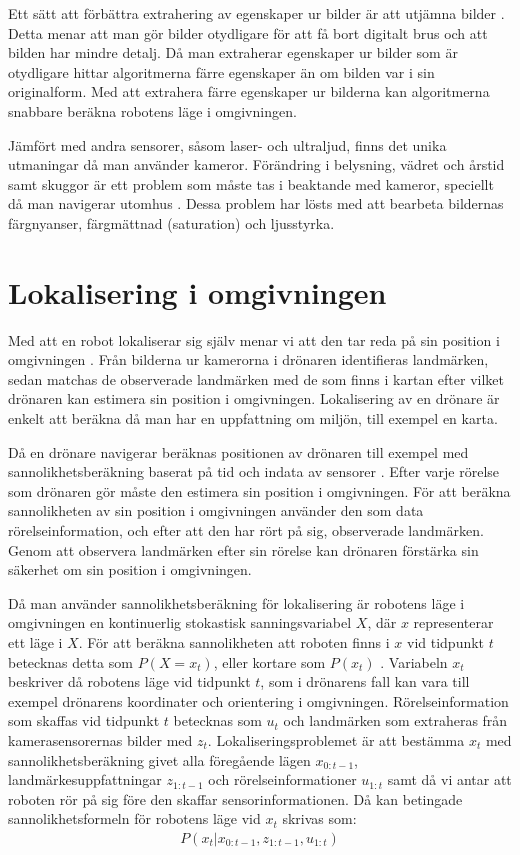 Ett sätt att förbättra extrahering av egenskaper ur bilder är att utjämna bilder \citep{mapbuildingsift}. Detta menar att man gör bilder otydligare för att få bort digitalt brus och att bilden har mindre detalj. Då man extraherar egenskaper ur bilder som är otydligare hittar algoritmerna färre egenskaper än om bilden var i sin originalform. Med att extrahera färre egenskaper ur bilderna kan algoritmerna snabbare beräkna robotens läge i omgivningen.

Jämfört med andra sensorer, såsom laser- och ultraljud, finns det unika utmaningar då man använder kameror. Förändring i belysning, vädret och årstid samt skuggor är ett problem som måste tas i beaktande med kameror, speciellt då man navigerar utomhus \citep{982903}. Dessa problem har lösts med att bearbeta bildernas färgnyanser, färgmättnad (saturation) och ljusstyrka.

\section{Lokalisering i omgivningen} \label{lokalisering}

Med att en robot lokaliserar sig själv menar vi att den tar reda på sin position i omgivningen \citep{982903}. Från bilderna ur kamerorna i drönaren identifieras landmärken, sedan matchas de observerade landmärken med de som finns i kartan efter vilket drönaren kan estimera sin position i omgivningen. Lokalisering av en drönare är enkelt att beräkna då man har en uppfattning om miljön, till exempel en karta.

Då en drönare navigerar beräknas positionen av drönaren till exempel med sannolikhetsberäkning baserat på tid och indata av sensorer \citep{ProbabilisticRobotics}. Efter varje rörelse som drönaren gör måste den estimera sin position i omgivningen. För att beräkna sannolikheten av sin position i omgivningen använder den som data rörelseinformation, och efter att den har rört på sig, observerade landmärken. Genom att observera landmärken efter sin rörelse kan drönaren förstärka sin säkerhet om sin position i omgivningen. 

Då man använder sannolikhetsberäkning för lokalisering är robotens läge i omgivningen en kontinuerlig stokastisk sanningsvariabel $X$, där $x$ representerar ett läge i $X$. För att beräkna sannolikheten att roboten finns i $x$ vid tidpunkt $t$ betecknas detta som $P(X = x_t)$, eller kortare som $P(x_t)$ \citep{ProbabilisticRobotics}. Variabeln $x_t$ beskriver då robotens läge vid tidpunkt $t$, som i drönarens fall kan vara till exempel drönarens koordinater och orientering i omgivningen. Rörelseinformation som skaffas vid tidpunkt $t$ betecknas som $u_t$ och landmärken som extraheras från kamerasensorernas bilder med $z_t$. Lokaliseringsproblemet är att bestämma $x_t$ med sannolikhetsberäkning givet alla föregående lägen $x_{0:t-1}$, landmärkesuppfattningar $z_{1:t-1}$ och rörelseinformationer $u_{1:t}$ samt då vi antar att roboten rör på sig före den skaffar sensorinformationen. Då kan betingade sannolikhetsformeln för robotens läge vid $x_t$ skrivas som:
\begin{align}
    P( x_t | x_{0:t-1}, z_{1:t-1}, u_{1:t})
\end{align}

